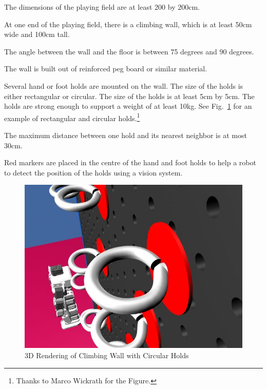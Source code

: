 \documentclass[12pt]{hurocup}
\begin{document}
\begin{lawlist}[CW]

\item The dimensions of the playing field are at least 200 by
  200cm. 

\item At one end of the playing field, there is a climbing wall, which
  is at least 50cm wide and 100cm tall. 

\item The angle between the wall and the floor is between 75 degrees
  and 90 degrees.
  
\item The wall is built out of reinforced peg board or similar
  material. 

\item Several hand or foot holds are mounted on the wall. The size of
  the holds is either rectangular or circular. The size of the holds
  is at least 5cm by 5cm. The holds are strong enough to support a
  weight of at least 10kg. See Fig.~\ref{fig:climbing-wall-holds} for
  an example of rectangular and circular holds.\footnote{Thanks to
    Marco Wickrath for the Figure.}

\item The maximum distance between one hold and its nearest neighbor
  is at most 30cm.

\item Red markers are placed in the centre of the hand and foot holds
  to help a robot to detect the position of the holds using a vision
  system.

\end{lawlist}

\begin{figure}
  \begin{center}
    \includegraphics[width=0.45\linewidth]{Figures/climbing-wall2}
  \end{center}
  \caption{3D Rendering of Climbing Wall with Circular
    Holds}
  \label{fig:climbing-wall-holds}
\end{figure}
\end{document}
